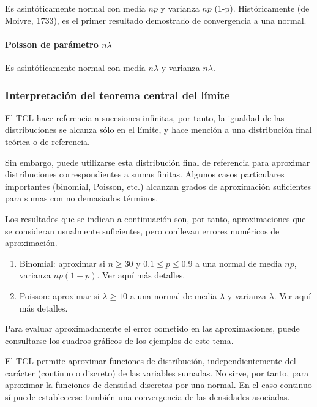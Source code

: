 \documentclass[
]{article}
\begin{document}
Es asintóticamente normal con media \(n p\) y varianza \(n p\) (1-p). Históricamente (de Moivre, 1733), es el primer resultado demostrado de convergencia a una normal.

\paragraph{\texorpdfstring{Poisson de parámetro \(n \lambda\)}{Poisson de parámetro n \textbackslash lambda}}\label{poisson-de-paruxe1metro-n-lambda}

Es asintóticamente normal con media \(n \lambda\) y varianza \(n \lambda\).

\subsubsection{Interpretación del teorema central del límite}\label{interpretaciuxf3n-del-teorema-central-del-luxedmite}

El TCL hace referencia a sucesiones infinitas, por tanto, la igualdad de las distribuciones se alcanza sólo en el límite, y hace mención a una distribución final teórica o de referencia.

Sin embargo, puede utilizarse esta distribución final de referencia para aproximar distribuciones correspondientes a sumas finitas. Algunos casos particulares importantes (binomial, Poisson, etc.) alcanzan grados de aproximación suficientes para sumas con no demasiados términos.

Los resultados que se indican a continuación son, por tanto, aproximaciones que se consideran usualmente suficientes, pero conllevan errores numéricos de aproximación.

\begin{enumerate}
\def\labelenumi{\arabic{enumi}.}
\item
  Binomial: aproximar si \(n \geq 30\) y \(0.1 \leq p \leq 0.9\) a una normal de media \(n p\), varianza \(n p(1-p)\). Ver aquí más detalles.
\item
  Poisson: aproximar si \(\lambda \geq 10\) a una normal de media \(\lambda\) y varianza \(\lambda\). Ver aquí más detalles.
\end{enumerate}

Para evaluar aproximadamente el error cometido en las aproximaciones, puede consultarse los cuadros gráficos de los ejemplos de este tema.

El TCL permite aproximar funciones de distribución, independientemente del carácter (continuo o discreto) de las variables sumadas. No sirve, por tanto, para aproximar la funciones de densidad discretas por una normal. En el caso continuo sí puede establecerse también una convergencia de las densidades asociadas.
\end{document}
